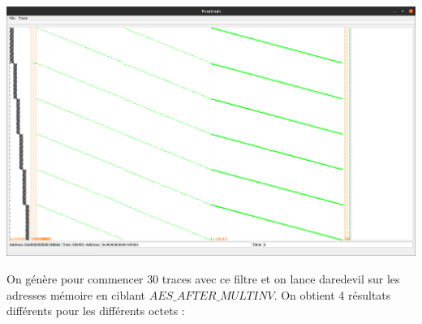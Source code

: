 \documentclass[10pt,a4paper]{article}
\begin{document}
\begin{center}
\includegraphics[scale=0.11]{Images/26_avec_filtre.png}\\
\end{center}
On génère pour commencer 30 traces avec ce filtre et on lance daredevil sur les adresses mémoire en ciblant $AES\_AFTER\_MULTINV$. On obtient 4 résultats différents pour les différents octets :\\
\end{document}
